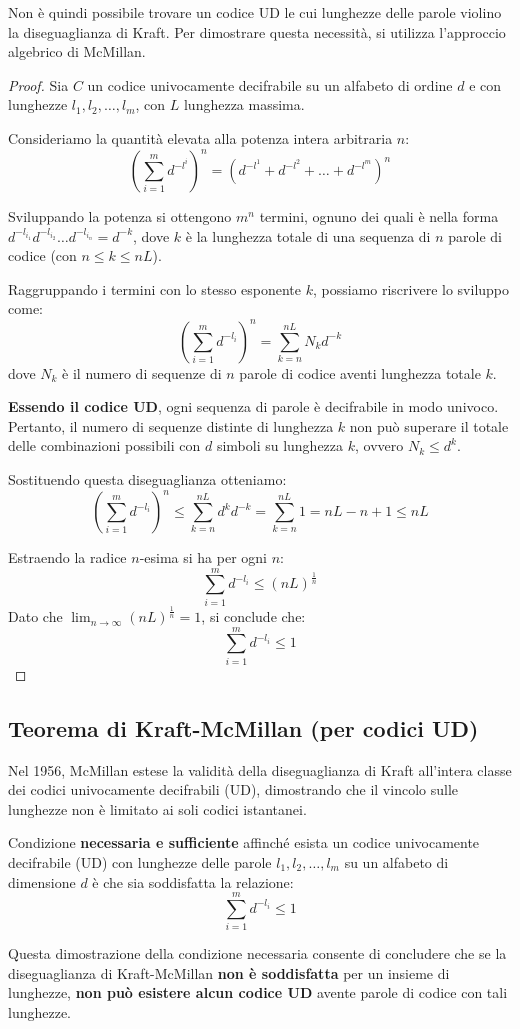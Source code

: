 Non è quindi possibile trovare un codice UD le cui lunghezze delle parole violino la diseguaglianza di Kraft. Per dimostrare questa necessità, si utilizza l'approccio algebrico di McMillan.
\begin{proof}
Sia $C$ un codice univocamente decifrabile su un alfabeto di ordine $d$ e con lunghezze $l_1, l_2, \dots, l_m$, con $L$ lunghezza massima.

Consideriamo la quantità elevata alla potenza intera arbitraria $n$:
\[\left(\sum_{i=1}^m d^{-l^i}\right)^n = \left(d^{-l^1} + d^{-l^2} + \dots + d^{-l^m}\right)^n\]

Sviluppando la potenza si ottengono $m^n$ termini, ognuno dei quali è nella forma $d^{-l_{i_1}} d^{-l_{i_2}} \dots d^{-l_{i_n}} = d^{-k}$, dove $k$ è la lunghezza totale di una sequenza di $n$ parole di codice (con $n \leq k \leq nL$).

Raggruppando i termini con lo stesso esponente $k$, possiamo riscrivere lo sviluppo come:
\[\left(\sum_{i=1}^m d^{-l_i}\right)^n = \sum_{k=n}^{nL} N_k d^{-k}\]
dove $N_k$ è il numero di sequenze di $n$ parole di codice aventi lunghezza totale $k$. 

\textbf{Essendo il codice UD}, ogni sequenza di parole è decifrabile in modo univoco. Pertanto, il numero di sequenze distinte di lunghezza $k$ non può superare il totale delle combinazioni possibili con $d$ simboli su lunghezza $k$, ovvero $N_k \leq d^k$.

Sostituendo questa diseguaglianza otteniamo:
\[\left(\sum_{i=1}^m d^{-l_i}\right)^n \leq \sum_{k=n}^{nL} d^k d^{-k} = \sum_{k=n}^{nL} 1 = nL - n + 1 \leq nL\]

Estraendo la radice $n$-esima si ha per ogni $n$:
\[\sum_{i=1}^m d^{-l_i} \leq (nL)^{\frac{1}{n}}\]
Dato che $\lim_{n\to\infty} (nL)^{\frac{1}{n}} = 1$, si conclude che:
\[\sum_{i=1}^m d^{-l_i} \leq 1\]
\end{proof}


\subsection{Teorema di Kraft-McMillan (per codici UD)}
Nel 1956, McMillan estese la validità della diseguaglianza di Kraft all'intera classe dei codici univocamente decifrabili (UD), dimostrando che il vincolo sulle lunghezze non è limitato ai soli codici istantanei.

\begin{theorem}
    Condizione \textbf{necessaria e sufficiente} affinché esista un codice univocamente decifrabile (UD) con lunghezze delle parole $l_1, l_2, \dots, l_m$ su un alfabeto di dimensione $d$ è che sia soddisfatta la relazione:
    \[ \sum_{i=1}^m d^{-l_i} \leq 1 \]
\end{theorem}
Questa dimostrazione della condizione necessaria consente di concludere che se la diseguaglianza di Kraft-McMillan \textbf{non è soddisfatta} per un insieme di lunghezze, \textbf{non può esistere alcun codice UD} avente parole di codice con tali lunghezze.

